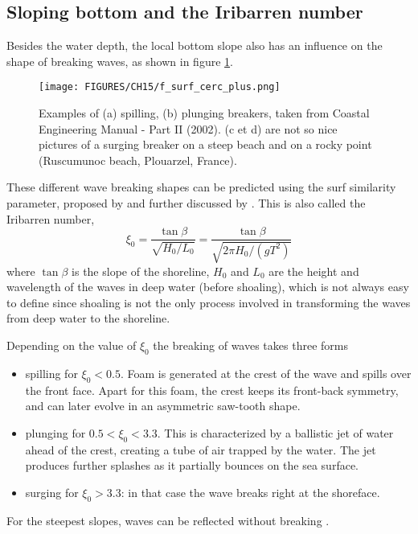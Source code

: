 \subsection{Sloping bottom and the Iribarren number}
Besides the water depth, the local bottom slope also has an influence on 
the shape of breaking waves, as shown in figure \ref{f_surf_cerc}.
\begin{figure}[htb]
\centerline{\texttt{[image: FIGURES/CH15/f\_surf\_cerc\_plus.png]}}
\caption{Examples of (a) spilling, (b) plunging breakers, taken from Coastal Engineering Manual - Part II (2002).  (c et d) 
are not so nice pictures of a surging breaker on a steep beach and on a rocky point (Ruscumunoc beach, Plouarzel, France).} \label{f_surf_cerc}
\end{figure}
These different wave breaking shapes can be predicted using the surf similarity parameter, proposed by \cite{Iribarren&Nogales1949} and further 
discussed by \cite{Battjes1974}. This is also called the Iribarren number, 
\begin{equation}
    \xi_0=\frac{\tan \beta}{\sqrt{H_0 /L_0}}=\frac{\tan \beta}{\sqrt{2 \pi H_0/(gT^2)}}
\end{equation}
where  $\tan \beta$ is the slope of the shoreline, $H_0$ and $L_0$ are the height and wavelength of the waves in deep 
water (before shoaling), which is not always easy to define since shoaling is not the only process involved in transforming the 
waves from deep water  to the shoreline. 

Depending on the value of $\xi_0$ the breaking of waves takes three forms
\begin{itemize}
 \item spilling for $\xi_0<0.5$. Foam is generated at the crest of the wave and spills over the front face. Apart for this foam, the crest keeps 
 its front-back symmetry, and can later evolve in  an asymmetric saw-tooth shape. 
 \item plunging for $0.5<\xi_0<3.3$. This is characterized by a ballistic jet of water ahead of the crest, creating a tube of air 
 trapped by the water. The jet produces further splashes as it partially bounces on the sea surface.
 \item surging for  $\xi_0>3.3$: in that case the wave breaks right at the shoreface. 
\end{itemize}
For the steepest slopes, waves can be reflected without breaking \citep{Carrier&Greenspan1958}. 

